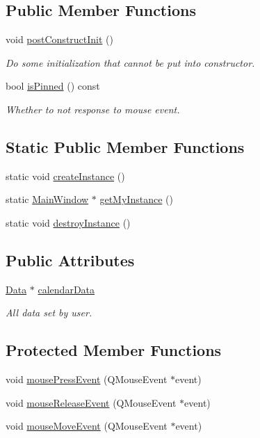 \subsection*{Public Member Functions}
\begin{DoxyCompactItemize}
\item 
void \hyperlink{classMainWindow_a8566d13d3417aa595a1533586cc3ada5}{post\+Construct\+Init} ()
\begin{DoxyCompactList}\small\item\em Do some initialization that cannot be put into constructor. \end{DoxyCompactList}\item 
bool \hyperlink{classMainWindow_aae7db4c3a3f3e723ec3d21adb9ef7fd4}{is\+Pinned} () const 
\begin{DoxyCompactList}\small\item\em Whether to not response to mouse event. \end{DoxyCompactList}\end{DoxyCompactItemize}
\subsection*{Static Public Member Functions}
\begin{DoxyCompactItemize}
\item 
static void \hyperlink{classMainWindow_a9d383570468f2568c9637c799fb1dfe1}{create\+Instance} ()
\item 
static \hyperlink{classMainWindow}{Main\+Window} $\ast$ \hyperlink{classMainWindow_a5f4dcec4f4725d36109f6530e52a22af}{get\+My\+Instance} ()
\item 
static void \hyperlink{classMainWindow_a61c1442c562239ef28e3d77d00d2234c}{destroy\+Instance} ()
\end{DoxyCompactItemize}
\subsection*{Public Attributes}
\begin{DoxyCompactItemize}
\item 
\hyperlink{classData}{Data} $\ast$ \hyperlink{classMainWindow_a4344962e43608c8c9f1b03e98eaa9283}{calendar\+Data}
\begin{DoxyCompactList}\small\item\em All data set by user. \end{DoxyCompactList}\end{DoxyCompactItemize}
\subsection*{Protected Member Functions}
\begin{DoxyCompactItemize}
\item 
void \hyperlink{classMainWindow_a2b5463ae209a03d1680b39c950dac8be}{mouse\+Press\+Event} (Q\+Mouse\+Event $\ast$event)
\item 
void \hyperlink{classMainWindow_a32bbb036a55856e49c31a5348f937b53}{mouse\+Release\+Event} (Q\+Mouse\+Event $\ast$event)
\item 
void \hyperlink{classMainWindow_a2cf42454562815dd44c716e78d515697}{mouse\+Move\+Event} (Q\+Mouse\+Event $\ast$event)
\end{DoxyCompactItemize}
